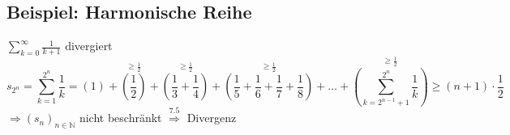 \subsection{Beispiel: Harmonische Reihe} %
\label{sub:beispiel_harmonische_reihe}
$\sum\limits_{k=0}^{\infty} \frac{1}{k+1}$ divergiert
\[
	s_{2^n} = \sum\limits_{k=1}^{2^n} \frac{1}{k} = (1) + 
	\overset{\geq \frac{1}{2}}{\left(\frac{1}{2}\right)}+
	\overset{\geq \frac{1}{2}}{\left(\frac{1}{3} + \frac{1}{4}\right) } +
	\overset{\geq \frac{1}{2}}{\left(\frac{1}{5} + \frac{1}{6} + \frac{1}{7} + \frac{1}{8}\right)} + \ldots +
	\overset{\geq \frac{1}{2}}{\left(\sum\limits_{k=2^{n-1}+1}^{2^n} \frac{1}{k}\right)} \geq (n+1) \cdot \frac{1}{2}
\]
$\Rightarrow (s_n)_{n \in \mathds{N}}$ nicht beschränkt $\overset{7.5}{\Longrightarrow}$ Divergenz

